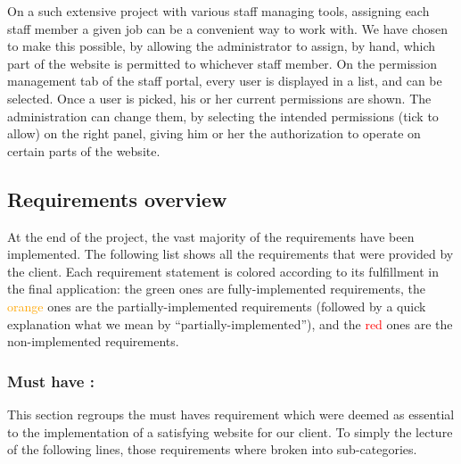 
On a such extensive project with various staff managing tools, assigning
each staff member a given job can be a convenient way to work with. We have
chosen to make this possible, by allowing the administrator to assign, by hand,
which part of the website is permitted to whichever staff member.
On the permission management tab of the staff portal, every user is displayed
in a list, and can be selected. Once a user is picked, his or her current
permissions are shown. The administration can change them, by selecting
the intended permissions (tick to allow) on the right panel,
giving him or her the authorization to operate on certain parts of the website.

\subsection{Requirements overview}
\label{Requirements overview}

At the end of the project, the vast majority of the requirements have been
implemented. The following list shows all the requirements that were provided
by the client. Each requirement statement is colored according to its
fulfillment in the final application: the \textcolor{green!60!black}{green} ones are fully-implemented
requirements, the \textcolor{orange}{orange} ones are the partially-implemented requirements
(followed by a quick explanation what we mean by
\enquote{partially-implemented}), and the \textcolor{red}{red} ones are the non-implemented
requirements. \newline

\subsubsection{Must have :}
\label{Must have}

This section regroups the must haves requirement which were deemed as essential 
to the implementation of a satisfying website for our client. To simply the lecture
of the following lines, those requirements where broken into sub-categories. \newline

